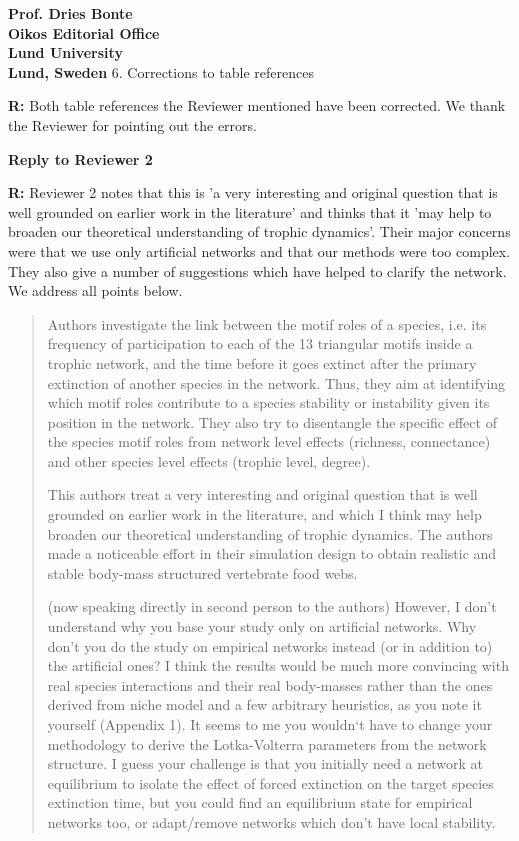 \documentclass[12pt]{letter}
\begin{document}
\begin{letter}{\bf Prof. Dries Bonte\\
Oikos Editorial Office \\
Lund University \\
Lund, Sweden}
  6. Corrections to table references 
  

    \textbf{R:} Both table references the Reviewer mentioned have been corrected. We thank the Reviewer for pointing out the errors.


\clearpage

{\large\textbf{Reply to Reviewer 2}}

\textbf{R:} Reviewer 2 notes that this is 'a very interesting and original question that is well grounded on earlier work in the literature' and thinks that it 'may help to broaden our theoretical understanding of trophic dynamics'. Their major concerns were that we use only artificial networks and that our methods were too complex. They also give a number of suggestions which have helped to clarify the network. We address all points below.

  \begin{quotation}
  Authors investigate the link between the motif roles of a species, i.e. its frequency of participation to each of the 13 triangular motifs inside a trophic network, and the time before it goes extinct after the primary extinction of another species in the network. Thus, they aim at identifying which motif roles contribute to a species stability or instability given its position in the network. They also try to disentangle the specific effect of the species motif roles from network level effects (richness, connectance) and other species level effects (trophic level, degree).


  This authors treat a very interesting and original question that is well grounded on earlier work in the literature, and which I think may help broaden our theoretical understanding of trophic dynamics. The authors made a noticeable effort in their simulation design to obtain realistic and stable body-mass structured vertebrate food webs.


  (now speaking directly in second person to the authors) However, I don’t understand why you base your study only on artificial networks. Why don’t you do the study on empirical networks instead (or in addition to) the artificial ones? I think the results would be much more convincing with real species interactions and their real body-masses rather than the ones derived from niche model and a few arbitrary heuristics, as you note it yourself (Appendix 1). It seems to me you wouldn`t have to change your methodology to derive the Lotka-Volterra parameters from the network structure. I guess your challenge is that you initially need a network at equilibrium to isolate the effect of forced extinction on the target species extinction time, but you could find an equilibrium state for empirical networks too, or adapt/remove networks which don’t have local stability.
  \end{quotation}



\end{letter}
\end{document}
